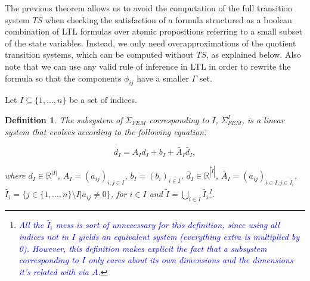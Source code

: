 \documentclass{article}
\newtheorem{definition}{Definition}
\newtheorem{problem}{Problem}
\newcommand*{\R}{\mathbb{R}}
\newcommand*{\fran}[1]{\textcolor{blue}{#1}}
\begin{document}
The previous theorem allows us to avoid the computation of the full transition
system $TS$ when checking the satisfaction of a formula structured as a boolean
combination of LTL formulas over atomic propositions referring to a small subset
of the state variables. Instead, we only need overapproximations of the quotient
transition systems, which can be computed without $TS$, as explained below. Also
note that we can use any valid rule of inference in LTL in order to rewrite the
formula so that the components $\phi_{ij}$ have a smaller $\Gamma$ set.

Let $I \subseteq \{1,...,n\}$ be a set of indices. 

\begin{definition}

The subsystem of $\Sigma_{FEM}$ corresponding to $I$,
$\Sigma_{FEM}^I$, is a linear system that evolves according to the following
equation:

\begin{equation}
    \dot{d_I} = A_I d_I + b_I + \tilde{A_I}\tilde{d_I},
\end{equation}

where $d_I \in \R^{|I|}$, $A_I = (a_{ij})_{i, j \in I}$, $b_I = (b_i)_{i
\in I}$, $\tilde{d_I} \in \R^{|\tilde{I}|} $, $\tilde{A_I} = (a_{ij})_{i \in I, j
\in \tilde{I_i}}$, $\tilde{I_i} = \{j \in \{1,...,n\} \setminus I | a_{ij} \neq 0\}$, for $i
\in I$ and $\tilde{I} = \bigcup_{i \in I} \tilde{I_i}$\footnote{\fran{All the
$\tilde{I_i}$ mess is sort of unnecessary for this definition, since using all
indices not in $I$ yields an equivalent system (everything extra is multiplied
by 0). However, this definition makes explicit the fact that a subsystem
corresponding to $I$ only cares about its own dimensions and the dimensions it's
related with via $A$.}}.

\end{definition}

%
%
%
%
%     
%
\end{document}

